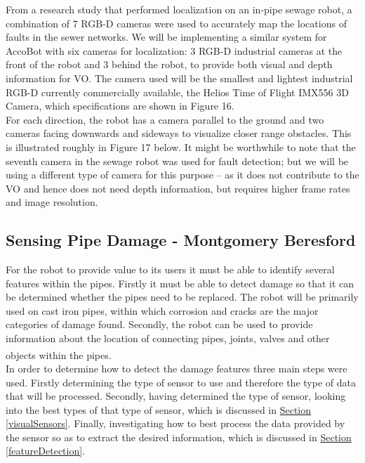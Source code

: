 \documentclass[11pt]{article}		%
\newcommand{\supercite}[1]{\textsuperscript{\cite{#1}}}		%
\newcommand{\sectref}[1]{\hyperref[#1]{Section \ref*{#1}}}     %
\begin{document}
	        From a research study that performed localization on an in-pipe sewage robot, a combination of 7 RGB-D cameras were used to accurately map the locations of faults in the sewer networks. We will be implementing a similar system for AccoBot with six cameras for localization: 3 RGB-D industrial cameras at the front of the robot and 3 behind the robot, to provide both visual and depth information for VO. The camera used will be the smallest and lightest industrial RGB-D currently commercially available, the Helios Time of Flight IMX556 3D Camera, which specifications are shown in Figure 16. 
	        \\ \hspace*{3ex}For each direction, the robot has a camera parallel to the ground and two cameras facing downwards and sideways to visualize closer range obstacles. This is illustrated roughly in Figure 17 below. It might be worthwhile to note that the seventh camera in the sewage robot was used for fault detection; but we will be using a different type of camera for this purpose – as it does not contribute to the VO and hence does not need depth information, but requires higher frame rates and image resolution. 
	        
	        
	        
	        \subsection[Sensing Pipe Damage]{Sensing Pipe Damage - Montgomery Beresford}
	        
	        For the robot to provide value to its users it must be able to identify several features within the pipes. 
	        Firstly it must be able to detect damage so that it can be determined whether the pipes need to be replaced.
	        The robot will be primarily used on cast iron pipes, within which corrosion and cracks are the major categories of damage found.  
	        Secondly, the robot can be used to provide information about the location of connecting pipes, joints, valves and other objects within the pipes.\supercite{Failure_pipes}\supercite{Failure_pipes2}
	        \\
	        In order to determine how to detect the damage features three main steps were used. 
	        Firstly determining the type of sensor to use and therefore the type of data that will be processed. 
	        Secondly, having determined the type of sensor, looking into the best types of that type of sensor, which is discussed in \sectref{visualSensors}.
	        Finally, investigating how to best process the data provided by the sensor so as to extract the desired information, which is discussed in \sectref{featureDetection}.
	        
\end{document}
